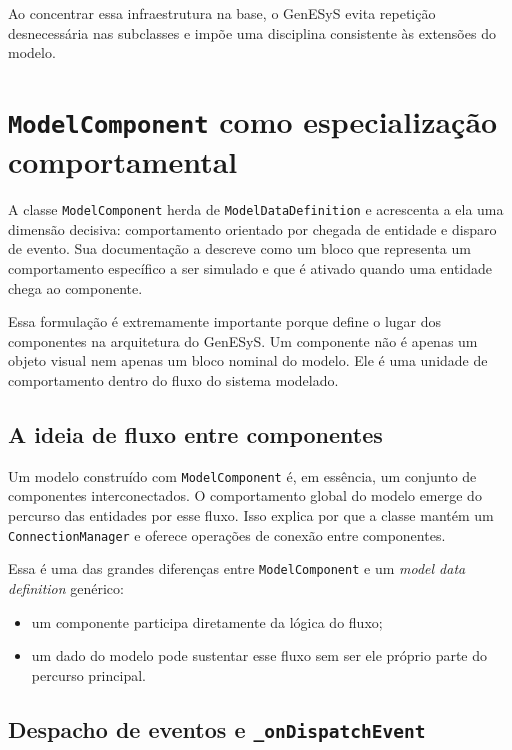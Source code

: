 Ao concentrar essa infraestrutura na base, o GenESyS evita repetição desnecessária nas subclasses e impõe uma disciplina consistente às extensões do modelo.

\section{\texttt{ModelComponent} como especialização comportamental}
\label{sec:cap8_modelcomponent}

A classe \texttt{ModelComponent} herda de \texttt{ModelDataDefinition} e acrescenta a ela uma dimensão decisiva: comportamento orientado por chegada de entidade e disparo de evento. Sua documentação a descreve como um bloco que representa um comportamento específico a ser simulado e que é ativado quando uma entidade chega ao componente.

Essa formulação é extremamente importante porque define o lugar dos componentes na arquitetura do GenESyS. Um componente não é apenas um objeto visual nem apenas um bloco nominal do modelo. Ele é uma unidade de comportamento dentro do fluxo do sistema modelado.

\subsection{A ideia de fluxo entre componentes}
\label{subsec:cap8_ideia_fluxo_componentes}

Um modelo construído com \texttt{ModelComponent} é, em essência, um conjunto de componentes interconectados. O comportamento global do modelo emerge do percurso das entidades por esse fluxo. Isso explica por que a classe mantém um \texttt{ConnectionManager} e oferece operações de conexão entre componentes.

Essa é uma das grandes diferenças entre \texttt{ModelComponent} e um \textit{model data definition} genérico:
\begin{itemize}
    \item um componente participa diretamente da lógica do fluxo;
    \item um dado do modelo pode sustentar esse fluxo sem ser ele próprio parte do percurso principal.
\end{itemize}

\subsection{Despacho de eventos e \texttt{\_onDispatchEvent}}
\label{subsec:cap8_dispatch_event_ondispatch}

